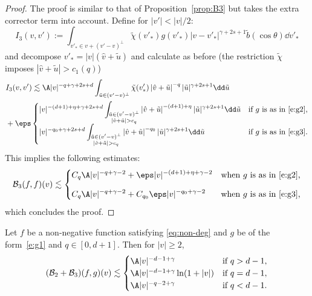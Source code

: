 \begin{proof}
The proof is similar to that of Proposition~\ref{prop:B3} but takes
the extra corrector term into account. Define for $|v'| < |v|/2$:
\begin{equation*}
I_3(v,v') := \int_{v'_* \in v + (v'-v)^\bot} \tilde \chi(v'_*) g(v'_*)
|v-v'_*|^{\gamma+2s+1} \tilde b(\cos \theta) \dd v'_*
\end{equation*}
and decompose $v'_* = |v| (\hat v + \tilde u)$ and calculate as before
(the restriction $\tilde \chi$ imposes $|\hat v + \tilde u| > c_1(q)$)
\begin{align*}
& I_3(v,v')
\lesssim \A |v|^{-q+ \gamma +2s+d} \int_{\tilde u \in (v'-v)^\bot}
\tilde \chi(v'_*) \left|\hat v + \tilde u \right|^{-q}
|\tilde u|^{\gamma+2s +1} \dd \tilde u \\
& + \eps \begin{cases} \displaystyle
|v|^{-(d+1)+\eta + \gamma +2s+d} \int_{\substack{\tilde u \in
(v'-v)^\bot\\\left|\hat v + \tilde u \right| > c_q}}
\left|\hat v + \tilde u \right|^{-(d+1)+\eta} |\tilde u|^{\gamma+2s
+1} \dd \tilde u & \text{if $g$ is as in \eqref{e:g2},} \\[3mm] \displaystyle
|v|^{-q_0 + \gamma +2s+d} \int_{\substack{\tilde u \in
(v'-v)^\bot\\\left|\hat v + \tilde u \right| > c_q}}
\left|\hat v + \tilde u \right|^{-q_0} |\tilde u|^{\gamma+2s +1} \dd
\tilde u & \text{if $g$ is as in \eqref{e:g3}.}
\end{cases}
\end{align*}
This implies the following estimates:
\begin{align*}
\mathcal{B}_3 (f,f)(v) \lesssim \begin{cases}\displaystyle
C_q \A |v|^{-q+\gamma-2} + \eps |v|^{-(d+1)+\eta + \gamma -2}
& \text{when $g$ is as in \eqref{e:g2},}\\[3mm] \displaystyle
C_q \A |v|^{-q+\gamma-2} + C_{q_0} \eps |v|^{-q_0 + \gamma -2} & \text{when $g$ is as in \eqref{e:g3},}
\end{cases}
\end{align*}
which concludes the proof.
\end{proof}

\begin{prop}\label{prop:B23-2}
Let $f$ be a non-negative function satisfying \eqref{eq:non-deg} and
$g$ be of the form~\eqref{e:g1} and $q \in [0,d+1]$. Then for $|v| \ge 2$,
\[ (\mathcal{B}_2 + \mathcal{B}_3)(f,g)(v) \lesssim \begin{cases}
\A |v|^{-d-1+\gamma} & \text{if } q > d-1,\\
\A |v|^{-d-1+\gamma} \ln (1+|v|) & \text{if } q = d-1,\\
\A |v|^{-q-2+\gamma} & \text{if } q < d-1.
\end{cases}
\]
\end{prop}


